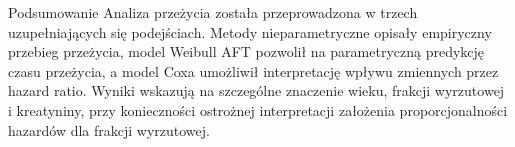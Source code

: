 \documentclass[aspectratio=169]{beamer}
\begin{document}
\begin{frame}{Podsumowanie}
Analiza przeżycia została przeprowadzona w trzech uzupełniających się podejściach. Metody nieparametryczne opisały empiryczny przebieg przeżycia, model Weibull AFT pozwolił na parametryczną predykcję czasu przeżycia, a model Coxa umożliwił interpretację wpływu zmiennych przez hazard ratio. Wyniki wskazują na szczególne znaczenie wieku, frakcji wyrzutowej i kreatyniny, przy konieczności ostrożnej interpretacji założenia proporcjonalności hazardów dla frakcji wyrzutowej.
\end{frame}
\end{document}

